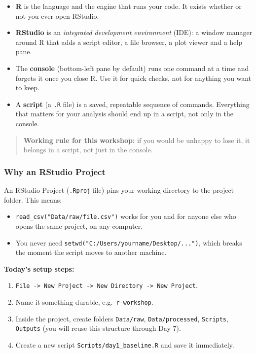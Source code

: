 \documentclass[11pt]{article}
\providecommand{\tightlist}{%
  \setlength{\itemsep}{0pt}\setlength{\parskip}{0pt}}
\begin{document}
\begin{itemize}
\tightlist
\item
  \textbf{R} is the language and the engine that runs your code. It
  exists whether or not you ever open RStudio.
\item
  \textbf{RStudio} is an \emph{integrated development environment}
  (IDE): a window manager around R that adds a script editor, a file
  browser, a plot viewer and a help pane.
\item
  The \textbf{console} (bottom-left pane by default) runs one command at
  a time and forgets it once you close R. Use it for quick checks, not
  for anything you want to keep.
\item
  A \textbf{script} (a \texttt{.R} file) is a saved, repeatable sequence
  of commands. Everything that matters for your analysis should end up
  in a script, not only in the console.
\end{itemize}

\begin{quote}
\textbf{Working rule for this workshop:} if you would be unhappy to lose
it, it belongs in a script, not just in the console.
\end{quote}

\hypertarget{why-an-rstudio-project}{%
\subsubsection{Why an RStudio Project}\label{why-an-rstudio-project}}

An RStudio Project (\texttt{.Rproj} file) pins your working directory to
the project folder. This means:

\begin{itemize}
\tightlist
\item
  \texttt{read\_csv("Data/raw/file.csv")} works for you and for anyone
  else who opens the same project, on any computer.
\item
  You never need \texttt{setwd("C:/Users/yourname/Desktop/...")}, which
  breaks the moment the script moves to another machine.
\end{itemize}

\textbf{Today's setup steps:}

\begin{enumerate}
\def\labelenumi{\arabic{enumi}.}
\tightlist
\item
  \texttt{File\ -\textgreater{}\ New\ Project\ -\textgreater{}\ New\ Directory\ -\textgreater{}\ New\ Project}.
\item
  Name it something durable, e.g.~\texttt{r-workshop}.
\item
  Inside the project, create folders \texttt{Data/raw},
  \texttt{Data/processed}, \texttt{Scripts}, \texttt{Outputs} (you will
  reuse this structure through Day 7).
\item
  Create a new script \texttt{Scripts/day1\_baseline.R} and save it
  immediately.
\end{enumerate}
\end{document}
